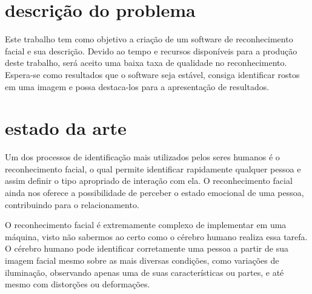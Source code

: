 
\section*{descrição do problema}

Este trabalho tem como objetivo a criação de um software de reconhecimento facial e sua descrição. Devido ao tempo e recursos disponíveis para a produção deste trabalho, será aceito uma baixa taxa de qualidade no reconhecimento. Espera-se como resultados que o software seja estável, consiga identificar rostos em uma imagem e possa destaca-los para a apresentação de resultados.

\section*{estado da arte}

Um dos processos de identificação mais utilizados pelos seres humanos é o reconhecimento facial, o qual permite identificar rapidamente qualquer pessoa e assim definir o tipo apropriado de interação com ela. O reconhecimento facial ainda nos oferece a possibilidade de perceber o estado emocional de uma pessoa, contribuindo para o relacionamento.

O reconhecimento facial é extremamente complexo de implementar em uma máquina, visto não sabermos ao certo como o cérebro humano realiza essa tarefa. O cérebro humano pode identificar corretamente uma pessoa a partir de sua imagem facial mesmo sobre as mais diversas condições, como variações de iluminação, observando apenas uma de suas características ou partes, e até mesmo com distorções ou deformações.


